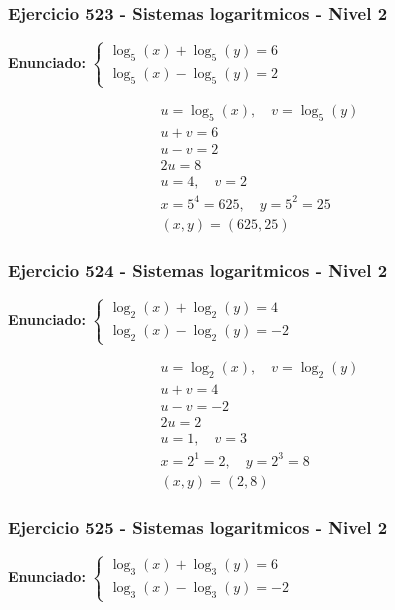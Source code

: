 \documentclass[12pt,a4paper]{article}
\begin{document}
\subsubsection*{Ejercicio 523 - Sistemas logaritmicos - Nivel 2}
\textbf{Enunciado:} \(\begin{cases} \log_{5}\left(x\right)+\log_{5}\left(y\right)=6\\ \log_{5}\left(x\right)-\log_{5}\left(y\right)=2\end{cases}\)

\[
\begin{aligned}
u=\log_{5}\left(x\right),\quad v=\log_{5}\left(y\right)\\
u+v=6\\
u-v=2\\
2u=8\\
u=4,\quad v=2\\
x=5^{4}=625,\quad y=5^{2}=25\\
\boxed{(x,y)=(625,25)}
\end{aligned}
\]


\subsubsection*{Ejercicio 524 - Sistemas logaritmicos - Nivel 2}
\textbf{Enunciado:} \(\begin{cases} \log_{2}\left(x\right)+\log_{2}\left(y\right)=4\\ \log_{2}\left(x\right)-\log_{2}\left(y\right)=-2\end{cases}\)

\[
\begin{aligned}
u=\log_{2}\left(x\right),\quad v=\log_{2}\left(y\right)\\
u+v=4\\
u-v=-2\\
2u=2\\
u=1,\quad v=3\\
x=2^{1}=2,\quad y=2^{3}=8\\
\boxed{(x,y)=(2,8)}
\end{aligned}
\]


\subsubsection*{Ejercicio 525 - Sistemas logaritmicos - Nivel 2}
\textbf{Enunciado:} \(\begin{cases} \log_{3}\left(x\right)+\log_{3}\left(y\right)=6\\ \log_{3}\left(x\right)-\log_{3}\left(y\right)=-2\end{cases}\)
\end{document}
